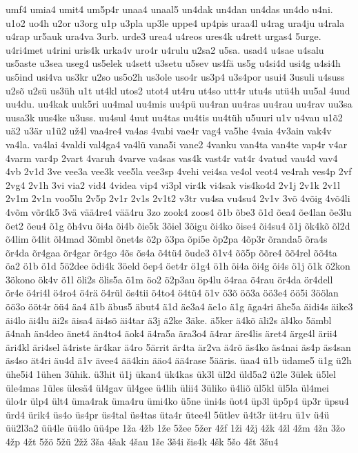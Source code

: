 {umf4
umia4
umit4
um5p4r
unaa4
unaal5
un4dak
un4dan
un4das
un4do
u4ni.
u1o2
uo4h
u2or
u3org
u1p
u3pla
up3le
uppe4
up4pis
uraa4l
u4rag
ura4ju
u4rala
u4rap
ur5auk
ura4va
3urb.
urde3
urea4
u4reos
ures4k
u4rett
urgas4
5urge.
u4ri4met
u4rini
uris4k
urka4v
uro4r
u4rulu
u2sa2
u5sa.
usad4
u4sae
u4salu
us5aste
u3sea
useg4
us5elek
u4sett
u3setu
u5sev
us4fä
us5g
u4si4d
usi4g
u4si4h
us5ind
usi4va
us3kr
u2so
us5o2h
us3ole
uso4r
us3p4
u3s4por
usui4
3usuli
u4suss
u2sõ
u2sü
us3üh
u1t
ut4kl
utos2
utot4
ut4ru
ut4so
utt4r
utu4s
utü4h
uu5al
4uud
uu4du.
uu4kak
uuk5ri
uu4mal
uu4mis
uu4pü
uu4ran
uu4ras
uu4rau
uu4rav
uu3sa
uusa3k
uus4ke
u3uss.
uu4sul
4uut
uu4tas
uu4tis
uu4tüh
u5uuri
u1v
u4vau
u1õ2
uä2
u3är
u1ü2
už4l
vaa4re4
va4as
4vabi
vae4r
vag4
va5he
4vaia
4v3ain
vak4v
va4la.
va4lai
4valdi
val4ga4
va4lü
vana5i
vane2
4vanku
van4ta
van4te
vap4r
v4ar
4varm
var4p
2vart
4varuh
4varve
va4sas
vas4k
vast4r
vat4r
4vatud
vau4d
vav4
4vb
2v1d
3ve
vee3a
vee3k
vee5la
vee3sp
4vehi
vei4sa
ve4ol
veot4
ve4rah
ves4p
2vf
2vg4
2v1h
3vi
via2
vid4
4videa
vip4
vi3pl
vir4k
vi4sak
vis4ko4d
2v1j
2v1k
2v1l
2v1m
2v1n
voo5lu
2v5p
2v1r
2v1s
2v1t2
v3tr
vu4sa
vu4su4
2v1v
3võ
4võig
4võ4li
4võm
võr4k5
3vä
vää4re4
vää4ru
3zo
zook4
zoos4
õ1b
õbe3
õ1d
õea4
õe4lan
õe3lu
õet2
õeu4
õ1g
õh4vu
õi4a
õi4b
õie5k
3õiel
3õigu
õi4ko
õise4
õi4su4
õ1j
õk4kõ
õl2d
õ4lim
õ4lit
õl4mad
3õmbl
õnet4s
õ2p
õ3pa
õpi5e
õp2pa
4õp3r
õranda5
õra4s
õr4da
õr4gaa
õr4gar
õr4go
4õs
õs4a
õ4tü4
õude3
õ1v4
õõ5p
õõre4
õõ4rel
õõ4ta
öa2
ö1b
ö1d
5ö2dee
ödi4k
3öeld
öep4
öet4r
ö1g4
ö1h
öi4a
öi4g
öi4s
ö1j
ö1k
ö2kon
3ökono
ök4v
ö1l
öli2s
ölis5a
ö1m
öo2
ö2p3au
öp4lu
ö4raa
ö4rau
ör4da
ör4dell
ör4e
ö4ri4l
ö4ro4
ö4rä
ö4rül
ös4tii
ö4to4
ö4tü4
ö1v
ö3õ
öö3a
öö3e4
öö5i
3öölan
öö3o
ööt4r
öü4
äa4
ä1b
äbus5
äbut4
ä1d
äe3a4
äe1o
ä1g
äga4ri
ähe5a
äidi4s
äike3
äi4lo
äi4lu
äi2s
äisa4
äi4sõ
äi4tar
ä3j
ä2ke
3äke.
ä5ker
ä4kõ
äli2s
äl4ko
5ämbl
ä4nah
än4deo
änet4
än4to4
äok4
ä4ra5a
ära3o4
ä4rar
äre4lis
äret4
ärge4l
ärii4
äri4kl
äri4sel
ä4riste
är4kar
ä4ro
5ärrit
är4ta
är2va
ä4rõ
äs4ko
äs4nai
äs4p
äs4san
äs4so
ät4ri
äu4d
ä1v
ävee4
ää4kin
ääo4
ää4rase
5ääris.
üaa4
ü1b
üdame5
ü1g
ü2h
ühe5i4
1ühen
3ühik.
ü3hit
ü1j
ükan4
ük4kas
ük3l
ül2d
üld5a2
ü2le
3ülek
ü5lel
üle4mas
1üles
ülesä4
ül4gav
ül4gee
ü4lih
ülii4
3üliko
ü4liõ
ül5kl
ül5la
ül4mei
ülo4r
ülp4
ült4
üma4rak
üma4ru
ümi4ko
ü5ne
üni4s
üot4
üp3l
üp5p4
üp3r
üpsu4
ürd4
ürik4
üs4o
üs4pr
üs4tal
üs4tas
üta4r
ütee4l
5ütlev
ü4t3r
üt4ru
ü1v
ü4ü
üü2l3a2
üü4le
üü4lo
üü4pe
1ža
4žb
1že
5žee
5žer
4žf
1ži
4žj
4žk
4žl
4žm
4žn
3žo
4žp
4žt
5žö
5žü
2žž
3ša
4šak
4šau
1še
3š4i
šis4k
4šk
5šo
4št
3šu4
}
